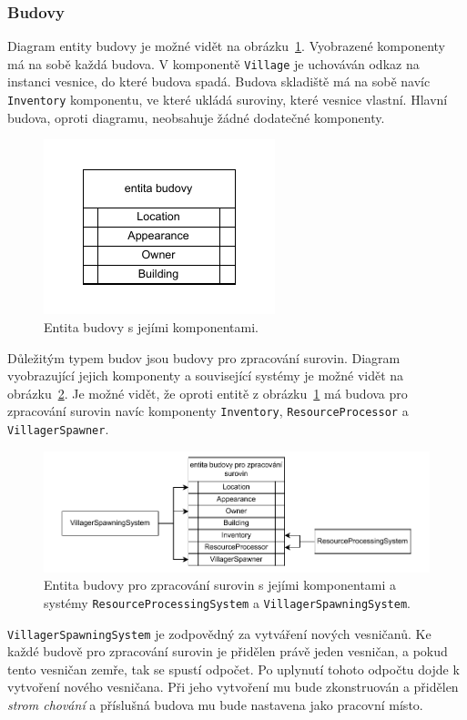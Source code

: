 \subsubsection{Budovy}
Diagram entity budovy je možné vidět na obrázku~\ref{fig:building}. Vyobrazené komponenty má na sobě každá budova. V komponentě \texttt{Village} je uchováván odkaz na instanci vesnice, do které budova spadá. Budova skladiště má na sobě navíc \texttt{Inventory} komponentu, ve které ukládá suroviny, které vesnice vlastní. Hlavní budova, oproti diagramu, neobsahuje žádné dodatečné komponenty.

\begin{figure}[!htb]
  \centering
  \includegraphics[width=0.4\linewidth]{img/building.pdf}
  \caption{Entita budovy s jejími komponentami.}
  \label{fig:building}
\end{figure}

Důležitým typem budov jsou budovy pro zpracování surovin. Diagram vyobrazující jejich komponenty a související systémy je možné vidět na obrázku~\ref{fig:res_building}. Je možné vidět, že oproti entitě z obrázku~\ref{fig:building} má budova pro zpracování surovin navíc komponenty \texttt{Inventory}, \texttt{ResourceProcessor} a \texttt{VillagerSpawner}.

\begin{figure}[!htb]
  \centering
  \includegraphics[width=1.0\linewidth]{img/resource_building.pdf}
  \caption{Entita budovy pro zpracování surovin s jejími komponentami a systémy \texttt{ResourceProcessingSystem} a \texttt{VillagerSpawningSystem}.}
  \label{fig:res_building}
\end{figure}

\texttt{VillagerSpawningSystem} je zodpovědný za vytváření nových vesničanů. Ke každé budově pro zpracování surovin je přidělen právě jeden vesničan, a pokud tento vesničan zemře, tak se spustí odpočet. Po uplynutí tohoto odpočtu dojde k vytvoření nového vesničana. Při jeho vytvoření mu bude zkonstruován a přidělen \textit{strom chování} a příslušná budova mu bude nastavena jako pracovní místo.

